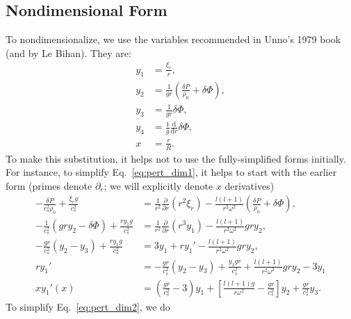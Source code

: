 \documentclass[11pt,
        usenames, %
        twocolumn,
        landscape,
        dvipsnames %
    ]{article}
\newcommand*{\rd}[2]{\frac{\mathrm{d}#1}{\mathrm{d}#2}}
\newcommand*{\pd}[2]{\frac{\partial#1}{\partial#2}}
\newcommand*{\p}[1]{\left(#1\right)}
\newcommand*{\s}[1]{\left[#1\right]}
\begin{document}
\subsection{Nondimensional Form}

To nondimensionalize, we use the variables recommended in Unno's 1979 book (and
by Le Bihan). They are:
\begin{align}
    y_1 &= \frac{\xi_r}{r},\\
    y_2 &= \frac{1}{gr}\p{\frac{\delta P}{\rho_0} + \delta \Phi},\\
    y_3 &= \frac{1}{gr}\delta \Phi,\\
    y_4 &= \frac{1}{g} \rd{}{r}\delta \Phi,\\
    x &= \frac{r}{R}.
\end{align}
To make this substitution, it helps not to use the fully-simplified forms
initially. For instance, to simplify Eq.~\eqref{eq:pert_dim1}, it helps to start
with the earlier form (primes denote $\partial_r$; we will explicitly denote $x$
derivatives)
\begin{align}
    -\frac{\delta P}{c_s^2\rho_0} + \frac{\xi_r g}{c_s^2}
        &= \frac{1}{r^2}\pd{}{r}(r^2\xi_r)
        - \frac{l(l + 1)}{r^2 \omega^2}\p{\frac{\delta P}{\rho_0} + \delta \Phi}
        ,\nonumber\\
    -\frac{1}{c_s^2}\p{gry_2 - \delta \Phi} + \frac{ry_1 g}{c_s^2}
        &= \frac{1}{r^2}\pd{}{r}(r^3y_1)
        - \frac{l(l + 1)}{r^2 \omega^2}gry_2
        ,\nonumber\\
    -\frac{gr}{c_s^2}\p{y_2 - y_3} + \frac{ry_1 g}{c_s^2}
        &= 3y_1 + ry_1'
        - \frac{l(l + 1)}{r^2 \omega^2}gry_2
        ,\nonumber\\
    ry_1' &= -\frac{gr}{c_s^2}\p{y_2 - y_3} + \frac{y_1 gr}{c_s^2}
            + \frac{l(l + 1)}{r^2 \omega^2}gry_2
            - 3y_1\nonumber\\
    xy_1'(x) &= \p{\frac{gr}{c_s^2} - 3}y_1
            + \s{\frac{l(l + 1)g}{r\omega^2} - \frac{gr}{c_s^2}}y_2
            + \frac{gr}{c_s^2}y_3.
\end{align}
To simplify Eq.~\eqref{eq:pert_dim2}, we do
\end{document}
